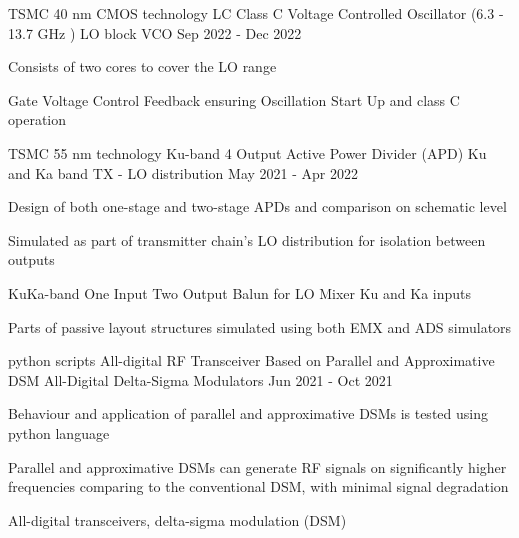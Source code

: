 


\begin{cventries}


\cventry
{TSMC 40 nm CMOS technology} %
{LC Class C Voltage Controlled Oscillator (6.3 - 13.7 GHz )} %
{LO block VCO} %
{Sep 2022 - Dec 2022} %
{ %
\begin{cvitems}
    \item {Consists of two cores to cover the LO range}
    \item {Gate Voltage Control Feedback ensuring Oscillation Start Up and class C operation}
\end{cvitems}
}


\cventry
{TSMC 55 nm technology} %
{Ku-band 4 Output Active Power Divider (APD)} %
{Ku and Ka band TX - LO distribution} %
{May 2021 - Apr 2022} %
{ %
\begin{cvitems}
    \item {Design of both one-stage and two-stage APDs and comparison on schematic level}
    \item {Simulated as part of transmitter chain's LO distribution for isolation between outputs}
    \item {KuKa-band One Input Two Output Balun for LO Mixer Ku and Ka inputs}
    \item {Parts of passive layout structures simulated using both EMX and ADS simulators}
\end{cvitems}
}


\cventry
{python scripts} %
{All-digital RF Transceiver Based on Parallel and Approximative DSM} %
{All-Digital Delta-Sigma Modulators} %
{Jun 2021 - Oct 2021} %
{ %
\begin{cvitems}
    \item {Behaviour and application of parallel and approximative DSMs is tested using python language}
    \item {Parallel and approximative DSMs can generate RF signals on significantly higher frequencies comparing to the conventional DSM, with minimal signal degradation}
    \item {All-digital transceivers, delta-sigma modulation (DSM)}
\end{cvitems}
}


\end{cventries}
